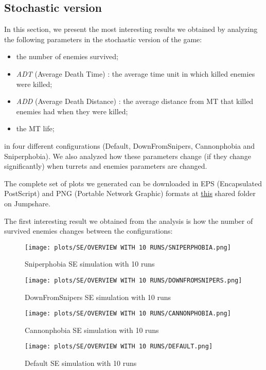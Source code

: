 \documentclass[
10pt, %
a4paper, %
oneside, %
headinclude,footinclude, %
BCOR5mm, %
]{scrartcl}
\begin{document}
		\subsection{Stochastic version}
			In this section, we present the most interesting results we obtained by analyzing the following parameters in the stochastic version of the game:
			\begin{itemize}
				\item the number of enemies survived;
				\item \emph{ADT} (Average Death Time) : the average time unit in which killed enemies were killed;
				\item \emph{ADD} (Average Death Distance) : the average distance from MT that killed enemies had when they were killed;
				\item the MT life;
			\end{itemize}
			in four different configurations (Default, DownFromSnipers, Cannonphobia and Sniperphobia). We also analyzed how these parameters change (if they change significantly) when turrets and enemies parameters are changed.
			
			The complete set of plots we generated can be downloaded in EPS (Encapsulated PostScript) and PNG (Portable Network Graphic) formats at \href{https://jmp.sh/0LxAWLjY}{this} shared folder on Jumpshare.
			
			The first interesting result we obtained from the analysis is how the number of survived enemies changes between the configurations:
			\begin{figure}[H]
				\centering
				\begin{minipage}{.45\textwidth}
					\centering
					\texttt{[image: plots/SE/OVERVIEW WITH 10 RUNS/SNIPERPHOBIA.png]}
					\caption{Sniperphobia SE simulation with 10 runs}
				\end{minipage}
				\begin{minipage}{.45\textwidth}
					\centering
					\texttt{[image: plots/SE/OVERVIEW WITH 10 RUNS/DOWNFROMSNIPERS.png]}
					\caption{DownFromSnipers SE simulation with 10 runs}
				\end{minipage}
			\end{figure}
			\begin{figure}[h!]
				\centering
				\begin{minipage}{.45\textwidth}
					\centering
					\texttt{[image: plots/SE/OVERVIEW WITH 10 RUNS/CANNONPHOBIA.png]}
					\caption{Cannonphobia SE simulation with 10 runs}
				\end{minipage}
				\begin{minipage}{.45\textwidth}
					\centering
					\texttt{[image: plots/SE/OVERVIEW WITH 10 RUNS/DEFAULT.png]}
					\caption{Default SE simulation with 10 runs}
				\end{minipage}
			\end{figure}
			
\end{document}
